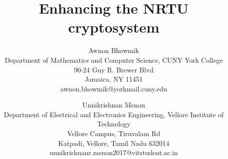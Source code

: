 \documentclass[a4paper,12pt]{article}
\begin{document}
\title{Enhancing the NRTU cryptosystem} %

\author{ 
   \large Awnon Bhowmik \\[-3pt]
   \normalsize Department of Mathematics and Computer Science, CUNY York College  \\[-3pt]
    \normalsize 90-24 Guy R. Brewer Blvd \\[-3pt]
    \normalsize Jamaica, NY 11451 \\[-3pt]
    \normalsize	awnon.bhowmik@yorkmail.cuny.edu \\[-3pt]
  \and
   \large Unnikrishnan Menon \\[-3pt]
   \normalsize Department of Electrical and Electronics Engineering, Vellore Institute of Technology  \\[-3pt]
    \normalsize Vellore Campus, Tiruvalam Rd \\[-3pt]
    \normalsize Katpadi, Vellore,
Tamil Nadu 632014 \\[-3pt]
    \normalsize	unnikrishnanr.menon2017@vitstudent.ac.in \\[-3pt]
}


\maketitle
\end{document}
